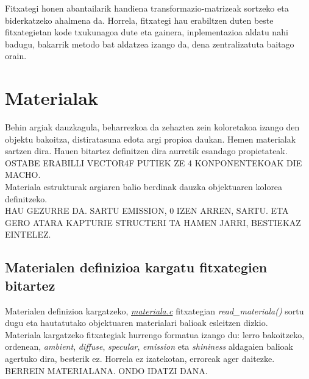 \documentclass[12pt]{article}
\newcommand{\fitxategi}[1] {\underline{\textit{#1}}}
\newcommand{\metodo}[1] {\textit{#1}}
\newcommand{\aldagai}[1] {\textit{#1}}
\begin{document}
Fitxategi honen abantailarik handiena transformazio-matrizeak sortzeko eta biderkatzeko ahalmena da. Horrela, fitxategi hau erabiltzen duten beste fitxategietan kode txukunagoa dute eta gainera, inplementazioa aldatu nahi badugu, bakarrik metodo bat aldatzea izango da, dena zentralizatuta baitago orain.\\

\section{Materialak}

Behin argiak dauzkagula, beharrezkoa da zehaztea zein koloretakoa izango den objektu bakoitza, distiratasuna edota argi propioa daukan. Hemen materialak sartzen dira. Hauen bitartez definitzen dira aurretik esandago propietateak.\\

OSTABE ERABILLI VECTOR4F PUTIEK ZE 4 KONPONENTEKOAK DIE MACHO.\\

Materiala estrukturak argiaren balio berdinak dauzka objektuaren kolorea definitzeko.\\

HAU GEZURRE DA. SARTU EMISSION, 0 IZEN ARREN, SARTU. ETA GERO ATARA KAPTURIE STRUCTERI TA HAMEN JARRI, BESTIEKAZ EINTELEZ.\\

\subsection{Materialen definizioa kargatu fitxategien bitartez}

Materialen definizioa kargatzeko, \fitxategi{materiala.c} fitxategian \metodo{read\_materiala()} sortu dugu eta hautatutako objektuaren materialari balioak esleitzen dizkio.\\

Materiala kargatzeko fitxategiak hurrengo formatua izango du: lerro bakoitzeko, ordenean, \aldagai{ambient}, \aldagai{diffuse}, \aldagai{specular}, \aldagai{emission} eta \aldagai{shininess} aldagaien balioak agertuko dira, besterik ez. Horrela ez izatekotan, erroreak ager daitezke.\\


BERREIN MATERIALANA. ONDO IDATZI DANA.
\end{document}
